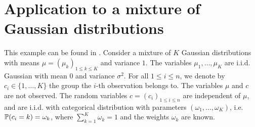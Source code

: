 \documentclass[english,graybox,envcountchap,envcountsame,sectrefs,shortlabels]{svmono}
\theoremstyle{style}
\begin{document}
\section{Application to a mixture of Gaussian distributions}

This example can be found in \cite{blei2017variational}. Consider a mixture of $K$ Gaussian distributions with means $\mu = (\mu_k)_{1\leqslant k \leqslant K}$ and variance $1$. The variables $\mu_1,\ldots,\mu_K$ are i.i.d. Gaussian with mean $0$ and variance $\sigma^2$. For all $1\leq i\leq n$, we denote by $c_i\in\{1, \ldots, K\}$ the group the $i$-th observation belongs to. The variables $\mu$ and $c$ are not observed. The random variables $c= (c_i)_{1\leq i\leq n}$ are independent of $\mu$, and are i.i.d. with categorical distribution with parameters $(\omega_1,\ldots,\omega_K)$, i.e. $\mathbb{P}(c_i = k) = \omega_k$, where $\sum_{k=1}^K\omega_k = 1$ and the weights $\omega_k$ are known.
\end{document}
